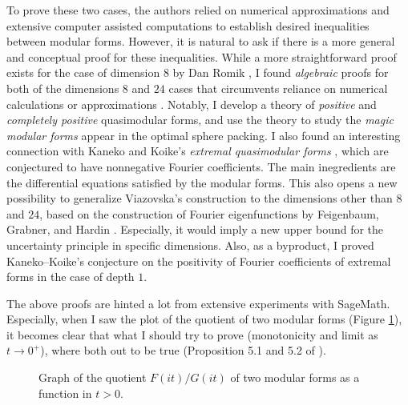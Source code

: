 \documentclass[12pt]{article}
\begin{document}
To prove these two cases, the authors \cite{viazovska2017sphere,cohn2017sphere} relied on numerical approximations and extensive computer assisted computations to establish desired inequalities between modular forms. However, it is natural to ask if there is a more general and conceptual proof for these inequalities.
While a more straightforward proof exists for the case of dimension $8$ by Dan Romik \cite{romik2023viazovska}, I found \emph{algebraic} proofs for both of the dimensions $8$ and $24$ cases that circumvents reliance on numerical calculations or approximations \cite{lee2024algebraic}.
Notably, I develop a theory of \emph{positive} and \emph{completely positive} quasimodular forms, and use the theory to study the \emph{magic modular forms} appear in the optimal sphere packing.
I also found an interesting connection with Kaneko and Koike's \emph{extremal quasimodular forms} \cite{kaneko2006extremal}, which are conjectured to have nonnegative Fourier coefficients.
The main inegredients are the differential equations satisfied by the modular forms.
This also opens a new possibility to generalize Viazovska's construction to the dimensions other than $8$ and $24$, based on the construction of Fourier eigenfunctions by Feigenbaum, Grabner, and Hardin \cite{feigenbaum2021eigenfunctions}.
Especially, it would imply a new upper bound for the uncertainty principle \cite{bourgain2010principe} in specific dimensions.
Also, as a byproduct, I proved Kaneko--Koike's conjecture on the positivity of Fourier coefficients of extremal forms in the case of depth $1$.

The above proofs are hinted a lot from extensive experiments with SageMath.
Especially, when I saw the plot of the quotient of two modular forms (Figure \ref{fig:d8graph}), it becomes clear that what I should try to prove (monotonicity and limit as $t \to 0^+$), where both out to be true (Proposition 5.1 and 5.2 of \cite{lee2024algebraic}).

\begin{figure}[h]
    \centering
    
    \caption{Graph of the quotient $F(it)/G(it)$ of two modular forms as a function in $t > 0$.}
    \label{fig:d8graph}
\end{figure}
\end{document}
